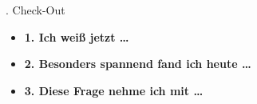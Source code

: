 \documentclass{beamer}
\begin{document}
\begin{frame}[t]{\faCheckCircle {}. Check-Out}
\vspace{0.5cm}

\begin{itemize}
    \setlength{\itemsep}{1.2cm}
    \item[\Large\faLightbulb] \Large \textbf{1. Ich weiß jetzt \dots}
    \item[\Large\faBrain] \Large \textbf{2. Besonders spannend fand ich heute \dots}
    \item[\Large\faQuestionCircle] \Large \textbf{3. Diese Frage nehme ich mit \dots}
\end{itemize}
\end{frame}
\end{document}
